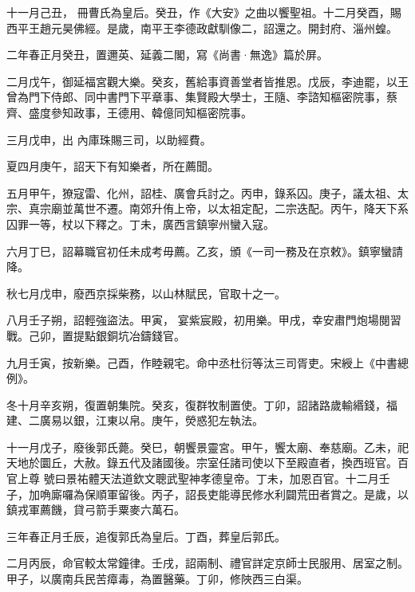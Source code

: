 \begin{pinyinscope}
 十一月己丑，
 冊曹氏為皇后。癸丑，作《大安》之曲以饗聖祖。十二月癸酉，賜西平王趙元昊佛經。是歲，南平王李德政獻馴像二，詔還之。開封府、淄州蝗。



 二年春正月癸丑，置邇英、延義二閣，寫《尚書·無逸》篇於屏。



 二月戊午，御延福宮觀大樂。癸亥，舊給事資善堂者皆推恩。戊辰，李迪罷，以王曾為門下侍郎、同中書門下平章事、集賢殿大學士，王隨、李諮知樞密院事，蔡齊、盛度參知政事，王德用、韓億同知樞密院事。



 三月戊申，出
 內庫珠賜三司，以助經費。



 夏四月庚午，詔天下有知樂者，所在薦聞。



 五月甲午，獠寇雷、化州，詔桂、廣會兵討之。丙申，錄系囚。庚子，議太祖、太宗、真宗廟並萬世不遷。南郊升侑上帝，以太祖定配，二宗迭配。丙午，降天下系囚罪一等，杖以下釋之。丁未，廣西言鎮寧州蠻入寇。



 六月丁巳，詔幕職官初任未成考毋薦。乙亥，頒《一司一務及在京敕》。鎮寧蠻請降。



 秋七月戊申，廢西京採柴務，以山林賦民，官取十之一。



 八月壬子朔，詔輕強盜法。甲寅，
 宴紫宸殿，初用樂。甲戌，幸安肅門炮場閱習戰。己卯，置提點銀銅坑冶鑄錢官。



 九月壬寅，按新樂。己酉，作睦親宅。命中丞杜衍等汰三司胥吏。宋綬上《中書總例》。



 冬十月辛亥朔，復置朝集院。癸亥，復群牧制置使。丁卯，詔諸路歲輸緡錢，福建、二廣易以銀，江東以帛。庚午，熒惑犯左執法。



 十一月戊子，廢後郭氏薨。癸巳，朝饗景靈宮。甲午，饗太廟、奉慈廟。乙未，祀天地於圜丘，大赦。錄五代及諸國後。宗室任諸司使以下至殿直者，換西班官。百官上尊
 號曰景祐體天法道欽文聰武聖神孝德皇帝。丁未，加恩百官。十二月壬子，加唃廝囉為保順軍留後。丙子，詔長吏能導民修水利闢荒田者賞之。是歲，以鎮戎軍薦饑，貸弓箭手粟麥六萬石。



 三年春正月壬辰，追復郭氏為皇后。丁酉，葬皇后郭氏。



 二月丙辰，命官較太常鐘律。壬戌，詔兩制、禮官詳定京師士民服用、居室之制。甲子，以廣南兵民苦瘴毒，為置醫藥。丁卯，修陜西三白渠。




\end{pinyinscope}
